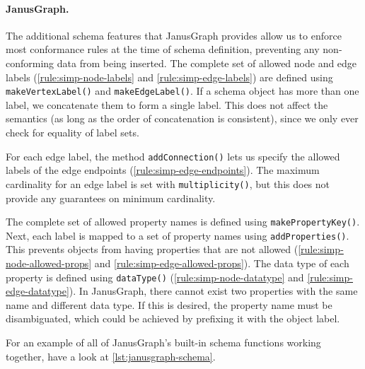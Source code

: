 \documentclass{report}
\theoremstyle{definition}
\begin{document}
\paragraph{JanusGraph.} The additional schema features that JanusGraph provides allow us to enforce most conformance rules at the time of schema definition, preventing any non-conforming data from being inserted. The complete set of allowed node and edge labels (\autoref{rule:simp-node-labels} and \ref{rule:simp-edge-labels}) are defined using \texttt{makeVertexLabel()} and \texttt{makeEdgeLabel()}. If a schema object has more than one label, we concatenate them to form a single label. This does not affect the semantics (as long as the order of concatenation is consistent), since we only ever check for equality of label sets.

For each edge label, the method \texttt{addConnection()} lets us specify the allowed labels of the edge endpoints (\autoref{rule:simp-edge-endpoints}). The maximum cardinality for an edge label is set with \texttt{multiplicity()}, but this does not provide any guarantees on minimum cardinality.

The complete set of allowed property names is defined using \texttt{makePropertyKey()}. Next, each label is mapped to a set of property names using \texttt{addProperties()}. This prevents objects from having properties that are not allowed (\autoref{rule:simp-node-allowed-props} and \ref{rule:simp-edge-allowed-props}). The data type of each property is defined using \texttt{dataType()} (\autoref{rule:simp-node-datatype} and \ref{rule:simp-edge-datatype}). In JanusGraph, there cannot exist two properties with the same name and different data type. If this is desired, the property name must be disambiguated, which could be achieved by prefixing it with the object label.

For an example of all of JanusGraph's built-in schema functions working together, have a look at \autoref{lst:janusgraph-schema}.
\end{document}
